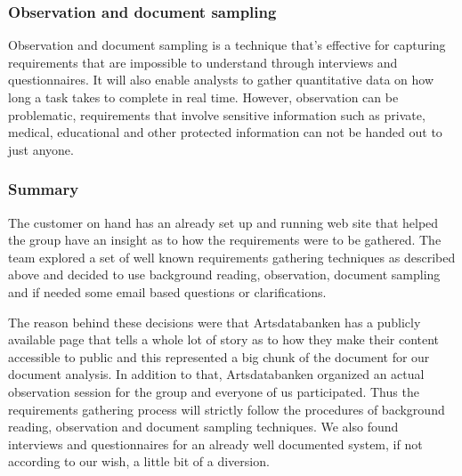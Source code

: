 \subsubsection{Observation and document sampling}

Observation and document sampling is a technique that's effective for capturing
requirements that are impossible to understand through interviews and
questionnaires. It will also enable analysts to gather quantitative data on how
long a task takes to complete in real time. However, observation can be
problematic, requirements that involve sensitive information such as private,
medical, educational and other protected information can not be handed out to just anyone.

\subsubsection{Summary}
The customer on hand has an already set up and running web site that helped the group have an insight as to how the requirements were to be gathered. The team explored a set of well known requirements gathering techniques as described above and decided to use  background reading, observation, document sampling and if needed some email based questions or clarifications.

The reason behind these decisions were that Artsdatabanken has a publicly available page that tells a whole lot of story as to how they make their content accessible to public and this represented a big chunk of the document for our document analysis. In addition to that, Artsdatabanken organized an actual observation session for the group and everyone of us participated. Thus the requirements gathering process will strictly follow the procedures of background reading, observation and document sampling techniques.  We also found interviews and questionnaires for an already well documented system, if not according to our wish, a little bit of a diversion. 
